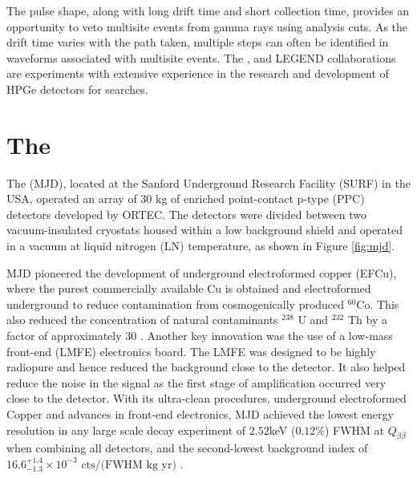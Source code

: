 The pulse shape, along with long drift time and short collection time, provides an opportunity to veto multisite events from gamma rays using analysis cuts. As the drift time varies with the path taken, multiple steps can often be identified in waveforms associated with multisite events. The {\MJ}, {\Gerda} and LEGEND collaborations are experiments with extensive experience in the research and development of HPGe detectors for {\onbb} searches.


\section{The {\MJD}}

The {\MJD} (MJD), located at the Sanford Underground Research Facility (SURF) in the USA, operated an array of 30 kg of enriched point-contact p-type (PPC) detectors developed by ORTEC. The detectors were divided between two vacuum-insulated cryostats housed within a low background shield and operated in a vacuum at liquid nitrogen (LN) temperature, as shown in Figure \ref{fig:mjd}. 

MJD pioneered the development of underground electroformed copper (EFCu), where the purest commercially available Cu is obtained and electroformed underground to reduce contamination from cosmogenically produced $^{60}$Co. This also reduced the concentration of natural contaminants $^{238}$ U and $^{232}$ Th by a factor of approximately 30 \cite{Abgrall:2016cct}. Another key innovation was the use of a low-mass front-end (LMFE) electronics board. The LMFE was designed to be highly radiopure and hence reduced the background close to the detector. It also helped reduce the noise in the signal as the first stage of amplification occurred very close to the detector. With its ultra-clean procedures, underground electroformed Copper and advances in front-end electronics, MJD achieved the lowest energy resolution in any large scale {\onbb} decay experiment of $2.52$keV ($0.12\%$) FWHM at $Q_{\beta\beta}$ when combining all detectors, and the second-lowest background index of $16.6^{+1.4}_{-1.3} \times 10^{-3} \text{ cts/(FWHM kg yr)}$ \cite{Majorana_final}.

